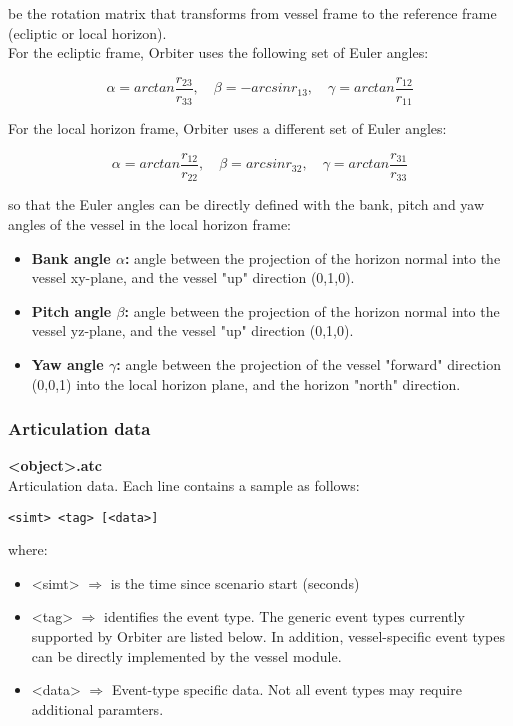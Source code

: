 \documentclass[Orbiter Technical Reference.tex]{subfiles}
\begin{document}
\noindent
be the rotation matrix that transforms from vessel frame to the reference frame (ecliptic or local horizon).\\
For the ecliptic frame, Orbiter uses the following set of Euler angles:

\[ \alpha = arctan\frac{r_{23}}{r_{33}}, \quad \beta = -arcsin r_{13}, \quad \gamma = arctan\frac{r_{12}}{r_{11}} \]

\noindent
For the local horizon frame, Orbiter uses a different set of Euler angles:

\[ \alpha = arctan\frac{r_{12}}{r_{22}}, \quad \beta = arcsin r_{32}, \quad \gamma = arctan\frac{r_{31}}{r_{33}} \]

\noindent
so that the Euler angles can be directly defined with the bank, pitch and yaw angles of the vessel in the local horizon frame:

\begin{itemize}
\item \textbf{Bank angle $\alpha$:} angle between the projection of the horizon normal into the vessel xy-plane, and the vessel "up" direction (0,1,0).
\item \textbf{Pitch angle $\beta$:} angle between the projection of the horizon normal into the vessel yz-plane, and the vessel "up" direction (0,1,0).
\item \textbf{Yaw angle $\gamma$:} angle between the projection of the vessel "forward" direction (0,0,1) into the local horizon plane, and the horizon "north" direction.
\end{itemize}

 
\subsubsection{Articulation data}
\textbf{<object>.atc}\\
Articulation data. Each line contains a sample as follows:

\begin{lstlisting}[language=OSFS]
<simt> <tag> [<data>]
\end{lstlisting}

\noindent
where:

\begin{itemize}
\item <simt> $\Rightarrow$ is the time since scenario start (seconds)
\item <tag> $\Rightarrow$ identifies the event type. The generic event types currently supported by Orbiter are listed below. In addition, vessel-specific event types can be directly implemented by the vessel module.
\item <data> $\Rightarrow$ Event-type specific data. Not all event types may require additional paramters.
\end{itemize}
\end{document}

